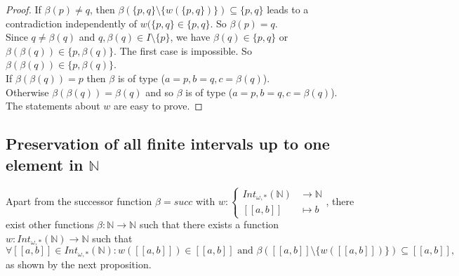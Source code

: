 \documentclass[a4paper,11pt]{article}
\newcommand*\circled[1]{\tikz[baseline=(char.base)]{
            \node[shape=circle,draw,inner sep=2pt] (char) {#1};}}
\theoremstyle{plain}
\theoremstyle{definition}
\theoremstyle{remark}
\begin{document}
\begin{proof}
If $\beta(p) \neq q$, then $\beta(\{p,q\} \setminus \{w(\{p,q\})\}) \subseteq \{p,q\}$ leads to a contradiction independently of $w(\{p,q\} \in \{p,q\}$. So $\beta(p)=q$. \\
Since $q \neq \beta(q)$ and $q,\beta(q) \in I \setminus \{p\}$, we have $\beta(q) \in \{p,q\}$ or $\beta(\beta(q)) \in \{p,\beta(q)\}$. The first case is impossible. So $\beta(\beta(q)) \in \{p,\beta(q)\}$. \\
If $\beta(\beta(q)) = p$ then $\beta$ is of type \circled{2} ($a=p, b=q, c=\beta(q)$). \\
Otherwise $\beta(\beta(q))=\beta(q)$ and so $\beta$ is of type \circled{1} ($a=p, b=q, c=\beta(q)$). \\
The statements about $w$ are easy to prove.
\end{proof}



\subsection{Preservation of all finite intervals up to one element in $\mathbb{N}$}

Apart from the successor function $\beta = succ$ with $w : \begin{cases} Int_{\omega,*}(\mathbb{N}) &\to \mathbb{N} \\ [\![a,b]\!] &\mapsto b \end{cases}$, there exist other functions $\beta : \mathbb{N} \to \mathbb{N}$ such that there exists a function $w : Int_{\omega,*}(\mathbb{N}) \to \mathbb{N}$ such that 
\[ \forall [\![a,b]\!] \in Int_{\omega,*}(\mathbb{N}) : w([\![a,b]\!]) \in [\![a,b]\!] \text{ and } \beta([\![a,b]\!] \setminus \{w([\![a,b]\!])\}) \subseteq [\![a,b]\!],\]
as shown by the next proposition. 
\end{document}
